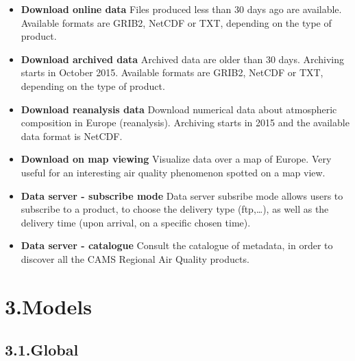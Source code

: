 \documentclass[9pt]{report}
\begin{document}
\begin{itemize}[noitemsep,topsep=\mdcompacttopsep]%

\item{}\textbf{Download online data}\mdbr
{}Files produced less than 30 days ago are available. Available formats are GRIB2, NetCDF or TXT, depending on the type of product.%

\item{}\textbf{Download archived data}\mdbr
{}Archived data are older than 30 days. Archiving starts in October 2015. Available formats are GRIB2, NetCDF or TXT, depending on the type of product.%

\item{}\textbf{Download reanalysis data}\mdbr
{}Download numerical data about atmospheric composition in Europe (reanalysis). Archiving starts in 2015 and the available data format is NetCDF.%

\item{}\textbf{Download on map viewing}\mdbr
{}Visualize data over a map of Europe. Very useful for an interesting air quality phenomenon spotted on a map view.%

\item{}\textbf{Data server - subscribe mode}\mdbr
{}Data server subsribe mode allows users to subscribe to a product, to choose the delivery type (ftp,\dots{}), as well as the delivery time (upon arrival, on a specific chosen time).%

\item{}\textbf{Data server - catalogue}\mdbr
{}Consult the catalogue of metadata, in order to discover all the CAMS Regional Air Quality products.%
\end{itemize}%

\section{3.\hspace*{0.5em}Models}\label{sec-models}%

\subsection{3.1.\hspace*{0.5em}Global}\label{sec-global}%
\end{document}
